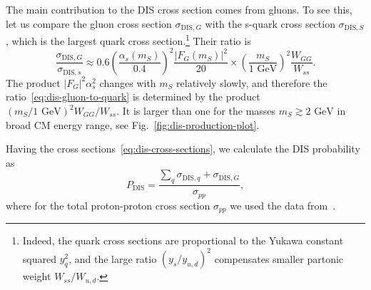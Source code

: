 \documentclass[a4paper,12pt,dvipsnames,usernames]{article}
\begin{document}
The main contribution to the DIS cross section comes from gluons. To see this, let us compare the gluon cross section $\sigma_{\text{DIS},G}$ with the s-quark cross section $\sigma_{\text{DIS},S}$, which is the largest quark cross section.\footnote{Indeed, the quark cross sections are proportional to the Yukawa constant squared $y_{q}^{2}$, and the large ratio $(y_{s}/y_{u,d})^{2}$ compensates smaller partonic weight $W_{ss}/W_{u,d}$.} Their ratio is
\begin{equation}
    \frac{\sigma_{\text{DIS},G}}{\sigma_{\text{DIS},s}}\approx 0.6\left(\frac{\alpha_{s}(m_{S})}{0.4}\right)^{2}\frac{|F_{G}(m_{S})|^{2}}{20}\times \left(\frac{m_{S}}{1\text{ GeV}}\right)^{2}\frac{W_{GG}}{W_{ss}}.
\label{eq:dis-gluon-to-quark}
\end{equation}
The product $|F_{G}|^{2} \alpha_{s}^{2}$ changes with $m_{S}$ relatively slowly, and therefore the ratio~\eqref{eq:dis-gluon-to-quark} is determined by the product $(m_{S}/1\text{ GeV})^{2}W_{GG}/W_{ss}$. It is larger than one for the masses $m_{S}\gtrsim 2 \text{ GeV}$ in broad CM energy range, see Fig.~\ref{fig:dis-production-plot}.

Having the cross sections~\eqref{eq:dis-cross-sections}, we calculate the DIS probability as
\begin{equation}
    P_{\text{DIS}} = \frac{\sum_{q}\sigma_{\text{DIS},q}+\sigma_{\text{DIS},G}}{\sigma_{pp}},
    \label{eq:dis-probability}
\end{equation}
where for the total proton-proton cross section $\sigma_{pp}$ we used the data from~\cite{Tanabashi:2018oca}.
\end{document}
